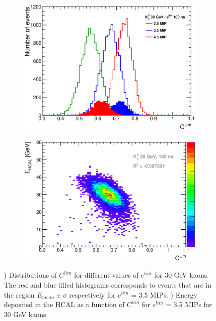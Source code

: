\begin{figure}[htbp!]
  \centering
  \begin{subfigure}[t]{0.49\textwidth}
    \centering
    \includegraphics[width=1\linewidth]{../Thesis_Plots/ILD/AdditionalPlots/Plots/CLim_100ns_30GeV.eps}
    \caption{} \label{fig:CLim30_100ns}
  \end{subfigure}
  \hfill
  \begin{subfigure}[t]{0.49\textwidth}
    \centering
    \includegraphics[width=1\linewidth]{../Thesis_Plots/ILD/AdditionalPlots/Plots/EhcalCLim_100ns_30GeV.eps}
    \caption{} \label{fig:EhcalCLim30_100ns}
  \end{subfigure}
  \caption{) Distributions of $C^{lim}$ for different values of $e^{lim}$ for 30 GeV kaons. The red and blue filled histograms corresponds to events that are in the region $E_{mean} \pm \sigma$ respectively for $e^{lim}$ = 3.5 MIPs. ) Energy deposited in the HCAL as a function of $C^{lim}$ for $e^{lim}$ = 3.5 MIPs for 30 GeV kaons.}
\end{figure}

